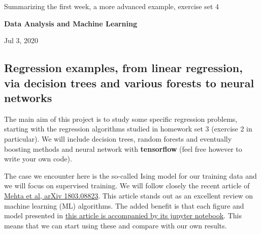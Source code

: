 \documentclass[%
oneside,                 %
final,                   %
10pt]{article}
\begin{document}

\newcommand{\exercisesection}[1]{\subsection*{#1}}






\thispagestyle{empty}

\begin{center}
{\LARGE\bf
\begin{spacing}{1.25}
Summarizing the first week, a more advanced example, exercise set 4
\end{spacing}
}
\end{center}


\begin{center}
{\bf Data Analysis and Machine Learning${}^{}$} \\ [0mm]
\end{center}

\begin{center}
\end{center}
    

\begin{center}
Jul 3, 2020
\end{center}

\vspace{1cm}


\subsection*{Regression examples, from linear regression, via decision trees and various forests to neural networks}

The main aim of this project is to study some specific 
regression problems, starting with the regression algorithms studied
in homework set 3 (exercise 2 in particular).
We will include decision trees, random forests and eventually boosting
methods  and neural network with \textbf{tensorflow} (feel free however to write your own code). 

The case we encounter here
is  the so-called Ising model for  our training data and we will
focus on supervised training. We will follow closely the recent
article of \href{{https://arxiv.org/abs/1803.08823}}{Mehta et al, arXiv
1803.08823}. This article stands
out as an excellent review on machine learning (ML) algorithms.
The added benefit is that each figure and
model presented in \href{{https://physics.bu.edu/~pankajm/MLnotebooks.html}}{this article is accompanied by its jupyter
notebook}. This
means that we can start using these and compare with our own results.
\end{document}
